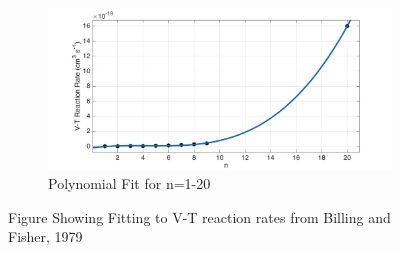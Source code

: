 \documentclass[11pt, oneside]{article}   	%
\begin{document}
\begin{figure}
\begin{subfigure}{0.5\textwidth}
\end{subfigure}
\begin{subfigure}{0.5\textwidth}
\includegraphics[width=\textwidth]{Figures/Polynomial}
\caption{Polynomial Fit for n=1-20}
\end{subfigure}
\caption{Figure Showing Fitting to V-T reaction rates from Billing and Fisher, 1979 \cite{Billing1979vv}}
\label{fig:fits}
\end{figure}
\end{document}
